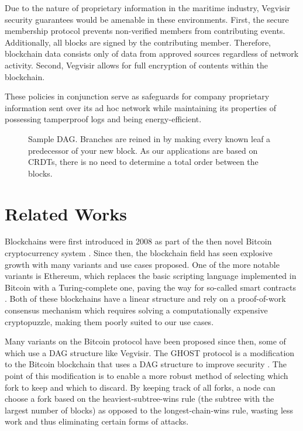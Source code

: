 \documentclass[conference, letterpaper]{IEEEtran}
\begin{document}
Due to the nature of proprietary information in the maritime industry, Vegvisir security guarantees would be amenable in these environments. First, the secure membership protocol prevents non-verified members from contributing events. Additionally, all blocks are signed by the contributing member. Therefore, blockchain data consists only of data from approved sources regardless of network activity.
Second, Vegvisir allows for full encryption of contents within the blockchain.

These policies in conjunction serve as safeguards for company proprietary information sent over its ad hoc network while maintaining its properties of possessing tamperproof logs and being energy-efficient. 

\begin{figure}
\centering

\caption{Sample DAG. Branches are reined in by making every known leaf a predecessor of your new block. As our applications are based on CRDTs, there is no need to determine a total order between the blocks.}
\label{fig:sampledag}
\end{figure}


\section{Related Works}
\label{sec:relatedworks}

Blockchains were first introduced in 2008 as part of the then novel Bitcoin cryptocurrency system \cite{nakamoto_bitcoin:_2008}. Since then, the blockchain field has seen explosive growth with many variants and use cases proposed. One of the more notable variants is Ethereum, which replaces the basic scripting language implemented in Bitcoin with a Turing-complete one, paving the way for so-called smart contracts \cite{wood_ethereum:_2017}. Both of these blockchains have a linear structure and rely on a proof-of-work consensus mechanism which requires solving a computationally expensive cryptopuzzle, making them poorly suited to our use cases.

Many variants on the Bitcoin protocol have been proposed since then, some of which use a DAG structure like Vegvisir. The GHOST protocol is a modification to the Bitcoin blockchain that uses a DAG structure to improve security \cite{sompolinsky_secure_2015}. The point of this modification is to enable a more robust method of selecting which fork to keep and which to discard. By keeping track of all forks, a node can choose a fork based on the heaviest-subtree-wins rule (the subtree with the largest number of blocks) as opposed to the longest-chain-wins rule, wasting less work and thus eliminating certain forms of attacks. 
\end{document}
